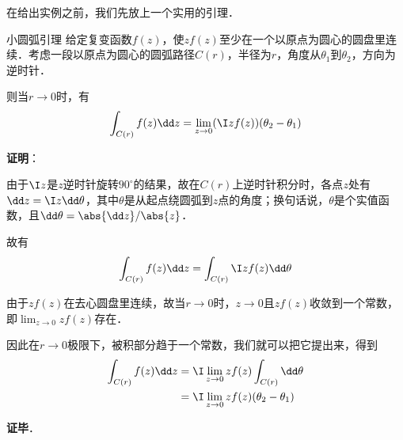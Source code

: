 在给出实例之前，我们先放上一个实用的引理．

\begin{lemma}{小圆弧引理}\label{JdLem_lem1}
给定复变函数$f(z)$，使$zf(z)$至少在一个以原点为圆心的圆盘里连续．考虑一段以原点为圆心的圆弧路径$C(r)$，半径为$r$，角度从$\theta_1$到$\theta_2$，方向为逆时针．

则当$r\to 0$时，有
\begin{equation}
\int_{C(r)}f(z)\dd z=\lim\limits_{z\to 0}(\I zf(z))(\theta_2-\theta_1)
\end{equation}

\end{lemma}


\textbf{证明}：

由于$\I z$是$z$逆时针旋转$90^\circ$的结果，故在$C(r)$上逆时针积分时，各点$z$处有$\dd z=\I z\dd \theta$，其中$\theta$是从起点绕圆弧到$z$点的角度；换句话说，$\theta$是个实值函数，且$\dd \theta=\abs{\dd z}/\abs{z}$．


故有
\begin{equation}
\begin{aligned}
\int_{C(r)}f(z)\dd z&=\int_{C(r)}\I zf(z)\dd \theta\\
\end{aligned}
\end{equation}

由于$zf(z)$在去心圆盘里连续，故当$r\to 0$时，$z\to 0$且$zf(z)$收敛到一个常数，即$\lim_{z\to 0}zf(z)$存在．

因此在$r\to 0$极限下，被积部分趋于一个常数，我们就可以把它提出来，得到
\begin{equation}
\begin{aligned}
\int_{C(r)}f(z)\dd z&=\I \lim_{z\to 0}zf(z)\int_{C(r)}\dd \theta\\
&=\I \lim_{z\to 0}zf(z)(\theta_2-\theta_1)
\end{aligned}
\end{equation}

\textbf{证毕}．











